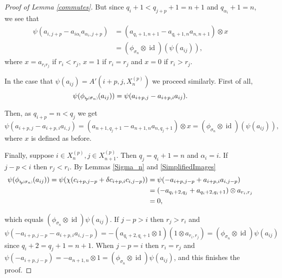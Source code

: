 \documentclass[11pt]{amsart}
\def\s{{\sigma}}
\def\a{\alpha}
\newcommand*{\subsmallp}[1]{\scalebox{.5}{\ensuremath#1}}
\newcommand{\subpp}[2][p]{\imath_{\hspace*{-1pt}#1}\hspace*{-.5pt}\subsmallp(#2\subsmallp)}
\newcommand\id{\operatorname{id}}
\theoremstyle{definition}
\begin{document}
\begin{proof} [Proof of Lemma \ref{commutes}]
\noindent But since $q_i+1<q_{j+p} + 1 = n+1$ and $q_{\a_i}+1=n$, we see that
\begin{align*}
\psi(a_{i,j+p} - a_{i\a_i}a_{\a_i,j+p}) &= (a_{q_i+1,n+1} - a_{q_i+1,n}a_{n,n+1})\otimes x\\
&= (\phi_{\s_n} \otimes \id)(\psi(a_{ij})),
\end{align*}
where $x=a_{r_ir_j}$ if $r_i<r_j$, $x=1$ if $r_i=r_j$ and $x=0$ if $r_i>r_j$.

\noindent In the case that $\psi(a_{ij}) = A'(i+p,j,X_n^{(p)})$ we proceed similarly. First of all,
$$\psi(\phi_{\subpp{\s_n}}(a_{ij})) = \psi(a_{i+p,j}-a_{i+p,i}a_{ij}).$$

\noindent Then, as $q_{i+p} = n<q_j$ we get 
$$\psi(a_{i+p,j} - a_{i+p,i}a_{i,j}) = (a_{n+1,q_j + 1} - a_{n+1,n}a_{n,q_j + 1})\otimes x = (\phi_{\s_n} \otimes \id)(\psi(a_{ij})),$$
where $x$ is defined as before.

\noindent Finally, suppose $i\in X_n^{(p)},j\in X_{n+1}^{(p)}$. Then $q_j=q_i+1=n$ and $\a_i=i$. If $j-p<i$ then $r_j<r_i$. By Lemmas \ref{Sigma_n} and \ref{SimplifiedImages}
\begin{align*}
  \psi(\phi_{\subpp{\s_n}}(a_{ij})) = \psi(\chi(c_{i+p,j-p}+\delta c_{i+p,i}c_{i,j-p}))
            &= \psi(-a_{i+p,j-p}+a_{i+p,i}a_{i,j-p})\\
            &= (-a_{q_i+2,q_j}+a_{q_i+2,q_i+1})\otimes a_{r_i,r_j}\\
            &=0,
\end{align*}

which equals $(\phi_{\s_n}\otimes\id)\psi(a_{ij})$. If $j-p>i$ then $r_j>r_i$ and 
  \[\psi(-a_{i+p,j-p}-a_{i+p,i}a_{i,j-p}) = -(a_{q_i+2,q_i+1}\otimes 1)(1\otimes a_{r_i,r_j}) = (\phi_{\s_n}\otimes\id)\psi(a_{ij})\]
since $q_i+2=q_j+1=n+1$. When $j-p=i$ then $r_i=r_j$ and $\psi(-a_{i+p,j-p}) = -a_{n+1,n}\otimes 1=(\phi_{\s_n}\otimes\id)\psi(a_{ij})$, and this finishes the proof.
\end{proof}
\end{document}
